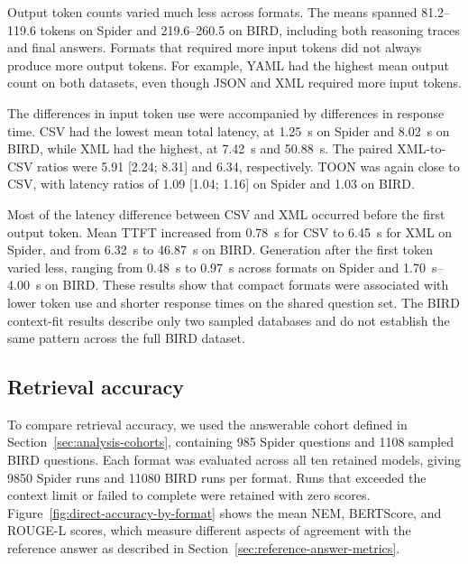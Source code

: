 Output token counts varied much less across formats. The means spanned \numrange{81.2}{119.6} tokens on
Spider and \numrange{219.6}{260.5} on BIRD, including both reasoning traces and final answers. Formats that
required more input tokens did not always produce more output tokens. For example, YAML had the highest mean
output count on both datasets, even though JSON and XML required more input tokens.

The differences in input token use were accompanied by differences in response time. CSV had the lowest mean
total latency, at \qty{1.25}{\second} on Spider and \qty{8.02}{\second} on BIRD, while XML had the highest,
at \qty{7.42}{\second} and \qty{50.88}{\second}. The paired XML-to-CSV ratios were \num{5.91}
[\num{2.24}; \num{8.31}] and \num{6.34}, respectively. TOON was again close to CSV,
with latency ratios of \num{1.09} [\num{1.04}; \num{1.16}] on Spider and \num{1.03} on BIRD.

Most of the latency difference between CSV and XML occurred before the first output token. Mean TTFT
increased from \qty{0.78}{\second} for CSV to \qty{6.45}{\second} for XML on Spider, and from
\qty{6.32}{\second} to \qty{46.87}{\second} on BIRD. Generation after the first token varied less, ranging
from \qty{0.48}{\second} to \qty{0.97}{\second} across formats on Spider and \qtyrange{1.70}{4.00}{\second}
on BIRD. These results show that compact formats were associated with lower token use and shorter response
times on the shared question set. The BIRD context-fit results describe only two sampled databases and do
not establish the same pattern across the full BIRD dataset.

\subsection{Retrieval accuracy}

To compare retrieval accuracy, we used the answerable cohort defined in Section~\ref{sec:analysis-cohorts},
containing \num{985} Spider questions and \num{1108} sampled BIRD questions. Each format was evaluated across
all ten retained models, giving \num{9850} Spider runs and \num{11080} BIRD runs per format. Runs that
exceeded the context limit or failed to complete were retained with zero scores.
Figure~\ref{fig:direct-accuracy-by-format} shows the mean NEM, BERTScore, and ROUGE-L scores, which measure
different aspects of agreement with the reference answer as described in Section~\ref{sec:reference-answer-metrics}.

